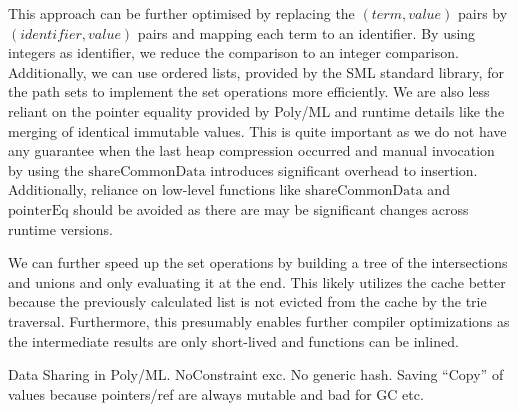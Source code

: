 This approach can be further optimised by replacing the $(term, value)$ pairs by $(identifier, value)$ pairs and mapping each term to an identifier. By using integers as identifier, we reduce the comparison to an integer comparison. Additionally, we can use ordered lists, provided by the SML standard library, for the path sets to implement the set operations more efficiently. We are also less reliant on the pointer equality provided by Poly/ML and runtime details like the merging of identical immutable values. This is quite important as we do not have any guarantee when the last heap compression occurred and manual invocation by using the $\mathrm{shareCommonData}$ introduces significant overhead to insertion. Additionally, reliance on low-level functions like $\mathrm{shareCommonData}$ and $\mathrm{pointerEq}$ should be avoided as there are may be significant changes across runtime versions.

We can further speed up the set operations by building a tree of the intersections and unions and only evaluating it at the end. This likely utilizes the cache better because the previously calculated list is not evicted from the cache by the trie traversal. Furthermore, this presumably enables further compiler optimizations as the intermediate results are only short-lived and functions can be inlined. 

Data Sharing in Poly/ML. NoConstraint exc. No generic hash. Saving ``Copy'' of values because pointers/ref are always mutable and bad for GC etc.
